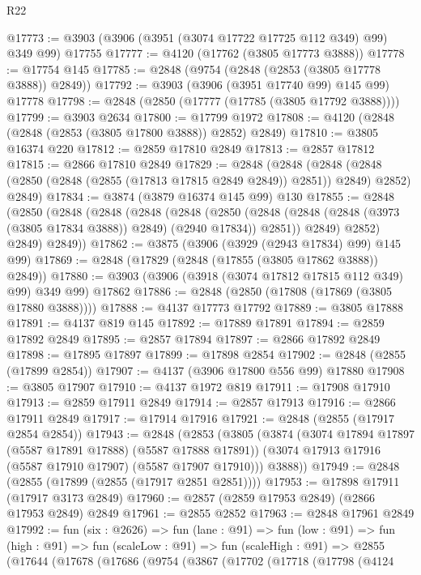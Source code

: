 \begin{lexlean}{R22}
\begin{coremodule}
@17773 := @3903 (@3906 (@3951 (@3074 @17722 @17725 @112 @349) @99) @349 @99) @17755
@17777 := @4120 (@17762 (@3805 @17773 @3888))
@17778 := @17754 @145
@17785 := @2848 (@9754 (@2848 (@2853 (@3805 @17778 @3888)) @2849))
@17792 := @3903 (@3906 (@3951 @17740 @99) @145 @99) @17778
@17798 := @2848 (@2850 (@17777 (@17785 (@3805 @17792 @3888))))
@17799 := @3903 @2634
@17800 := @17799 @1972
@17808 := @4120 (@2848 (@2848 (@2853 (@3805 @17800 @3888)) @2852) @2849)
@17810 := @3805 @16374 @220
@17812 := @2859 @17810 @2849
@17813 := @2857 @17812
@17815 := @2866 @17810 @2849
@17829 := @2848
    (@2848
      (@2848 (@2848 (@2850 (@2848 (@2855 (@17813 @17815 @2849 @2849)) @2851)) @2849) @2852)
      @2849)
@17834 := @3874 (@3879 @16374 @145 @99) @130
@17855 := @2848
    (@2850
      (@2848
        (@2848
          (@2848
            (@2848
              (@2850
                (@2848 (@2848 (@2848 (@3973 (@3805 @17834 @3888)) @2849) (@2940 @17834)) @2851))
              @2849)
            @2852)
          @2849)
        @2849))
@17862 := @3875 (@3906 (@3929 (@2943 @17834) @99) @145 @99)
@17869 := @2848 (@17829 (@2848 (@17855 (@3805 @17862 @3888)) @2849))
@17880 := @3903 (@3906 (@3918 (@3074 @17812 @17815 @112 @349) @99) @349 @99) @17862
@17886 := @2848 (@2850 (@17808 (@17869 (@3805 @17880 @3888))))
@17888 := @4137 @17773 @17792
@17889 := @3805 @17888
@17891 := @4137 @819 @145
@17892 := @17889 @17891
@17894 := @2859 @17892 @2849
@17895 := @2857 @17894
@17897 := @2866 @17892 @2849
@17898 := @17895 @17897
@17899 := @17898 @2854
@17902 := @2848 (@2855 (@17899 @2854))
@17907 := @4137 (@3906 @17800 @556 @99) @17880
@17908 := @3805 @17907
@17910 := @4137 @1972 @819
@17911 := @17908 @17910
@17913 := @2859 @17911 @2849
@17914 := @2857 @17913
@17916 := @2866 @17911 @2849
@17917 := @17914 @17916
@17921 := @2848 (@2855 (@17917 @2854 @2854))
@17943 := @2848
    (@2853
      (@3805
        (@3874
          (@3074 @17894 @17897 (@5587 @17891 @17888) (@5587 @17888 @17891))
          (@3074 @17913 @17916 (@5587 @17910 @17907) (@5587 @17907 @17910)))
        @3888))
@17949 := @2848 (@2855 (@17899 (@2855 (@17917 @2851 @2851))))
@17953 := @17898 @17911 (@17917 @3173 @2849)
@17960 := @2857 (@2859 @17953 @2849) (@2866 @17953 @2849) @2849
@17961 := @2855 @2852
@17963 := @2848 @17961 @2849
@17992 := fun (six : @2626) =>
  fun (lane : @91) =>
  fun (low : @91) =>
  fun (high : @91) =>
  fun (scaleLow : @91) =>
  fun (scaleHigh : @91) =>
  @2855
    (@17644
      (@17678
        (@17686
          (@9754
            (@3867
              (@17702
                (@17718
                  (@17798
                    (@4124

\end{coremodule}
\end{lexlean}
